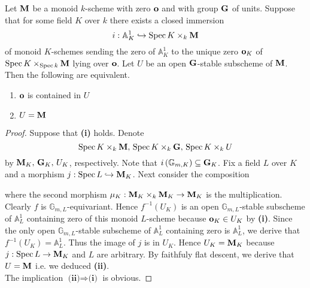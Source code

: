 \begin{proposition}
Let $\mathbf{M}$ be a monoid $k$-scheme with zero $\mathbf{o}$ and with group $\mathbf{G}$ of units. Suppose that for some field $K$ over $k$ there exists a closed immersion
$$i:\mathbb{A}^1_K\hookrightarrow \mathrm{Spec}\, K\times_k\mathbf{M}$$
of monoid $K$-schemes sending the zero of $\mathbb{A}^1_K$ to the unique zero $\mathbf{o}_K$ of $\mathrm{Spec}\, K\times_{\mathrm{Spec}\, k}\mathbf{M}$ lying over $\mathbf{o}$. Let $U$ be an open $\mathbf{G}$-stable subscheme of $\mathbf{M}$. Then the following are equivalent.
\begin{enumerate}[label=\textbf{\emph{(\roman*)}}, leftmargin=3.0em]
\item $\mathbf{o}$ is contained in $U$
\item $U = \mathbf{M}$
\end{enumerate}
\end{proposition}
\begin{proof}
Suppose that \textbf{(i)} holds. Denote
$$\mathrm{Spec}\, K\times_k \mathbf{M},\,\mathrm{Spec}\, K\times_k \mathbf{G},\,\mathrm{Spec}\, K\times_kU$$
by $\mathbf{M}_K,\,\mathbf{G}_K,\,U_K$, respectively. Note that $i\left(\mathbb{G}_{m,K}\right)\subseteq \mathbf{G}_K$. Fix a field $L$ over $K$ and a morphism $j:\mathrm{Spec}\, L \hookrightarrow \mathbf{M}_K$. Next consider the composition
\begin{center}
\end{center}
where the second morphism $\mu_K:\mathbf{M}_K\times_k \mathbf{M}_K\rightarrow \mathbf{M}_K$ is the multiplication. Clearly $f$ is $\mathbb{G}_{m,L}$-equivariant. Hence $f^{-1}(U_K)$ is an open $\mathbb{G}_{m,L}$-stable subscheme of $\mathbb{A}^1_{L}$ containing zero of this monoid $L$-scheme because $\mathbf{o}_K \in U_K$ by \textbf{(i)}. Since the only open $\mathbb{G}_{m,L}$-stable subscheme of $\mathbb{A}^1_{L}$ containing zero is $\mathbb{A}^1_{L}$, we derive that $f^{-1}(U_K) = \mathbb{A}^1_{L}$. Thus the image of $j$ is in $U_K$. Hence $U_K = \mathbf{M}_K$ because $j:\mathrm{Spec}\, L\rightarrow \mathbf{M}_K$ and $L$ are arbitrary. By faithfuly flat descent, we derive that $U = \mathbf{M}$ i.e. we deduced \textbf{(ii)}.\\
The implication $\textbf{(ii)}\Rightarrow \textbf{(i)}$ is obvious.
\end{proof}

